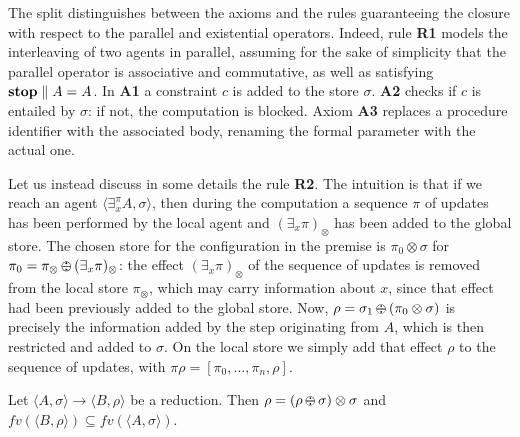 \documentclass{llncs}
\newcommand{\ostop}{{\bf stop}}
\newcommand{\rarrow}{\rightarrow}
\def\odiv{\, {\ominus\hspace{-7.7pt} \div} \,}
\begin{document}
The split distinguishes between the axioms and the rules guaranteeing the closure with respect to the parallel and existential operators. Indeed, rule {\bf  R1} models the interleaving of two agents in parallel, assuming for the sake of simplicity
that the parallel operator is associative and commutative, as well as satisfying $ \hbox{\ostop} \parallel A = A$.
%
%
In {\bf A1} a constraint $c$ is added to the store $\sigma$.
%
{\bf A2} checks if $c$ is entailed by  $\sigma$: if not, the computation is blocked.
%
Axiom {\bf A3} replaces a procedure identifier with the associated body, renaming the formal parameter with the actual one.
%

Let us instead discuss in some details the rule {\bf R2}.
The intuition is that if we reach an agent $\langle \exists^{\pi}_x A,\sigma\rangle$, then during the computation
a sequence $\pi$ of updates has been performed by the local agent and $(\exists_x \pi)_\otimes$ 
has been added to the global store. 
The chosen store for the configuration in the premise is 
$\pi_0 \otimes \sigma$ for $\pi_0 = \pi_\otimes \odiv (\exists_x \pi)_\otimes$: the
effect $(\exists_x \pi)_\otimes$ of the sequence of updates is removed from the local store $\pi_\otimes$,
which may carry information about $x$, since that effect had been previously added to the global store.
%
Now, $\rho = \sigma_1 \odiv (\pi_0 \otimes \sigma)$ 
is precisely the information added by the step originating from $A$, which is then restricted and added to $\sigma$. 
On the local store we simply add that effect $\rho$ to the sequence of updates, with
$\pi \rho = [\pi_0, \ldots, \pi_n, \rho]$.

\begin{lemma}[On monotonicity]
\label{rmono}
Let $\langle A, \sigma \rangle \rightarrow \langle B, \rho \rangle$ be a reduction. 
Then $\rho = (\rho \odiv \sigma) \otimes \sigma$ and $fv(\langle B, \rho \rangle) \subseteq fv(\langle A, \sigma \rangle)$.
\end{lemma}
 
\end{document}
